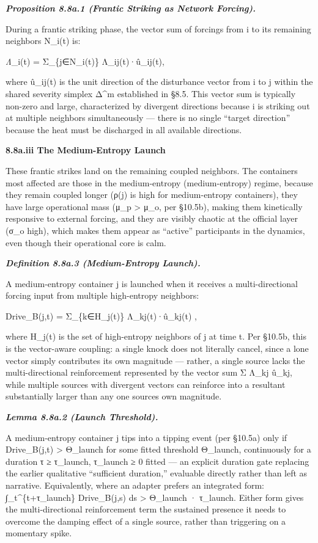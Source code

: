 \documentclass[
]{article}
\begin{document}
\emph{\textbf{Proposition 8.8a.1 (Frantic Striking as Network
Forcing).}}

During a frantic striking phase, the vector sum of forcings from i to
its remaining neighbors N\_i(t) is:

\emph{Λ⃗}\_i(t) = Σ\_\{j∈N\_i(t)\} Λ\_ij(t)·û\_ij(t),

where û\_ij(t) is the unit direction of the disturbance vector from i to
j within the shared severity simplex Δ\^{}m established in §8.5. This
vector sum is typically non-zero and large, characterized by divergent
directions because i is striking out at multiple neighbors
simultaneously --- there is no single ``target direction'' because the
heat must be discharged in all available directions.

\textbf{8.8a.iii The Medium-Entropy Launch}

These frantic strikes land on the remaining coupled neighbors. The
containers most affected are those in the medium-entropy
(medium-entropy) regime, because they remain coupled longer (ρ(j) is
high for medium-entropy containers), they have large operational mass
(μ\_p \textgreater{} μ\_o, per §10.5b), making them kinetically
responsive to external forcing, and they are visibly chaotic at the
official layer (σ\_o high), which makes them appear as ``active''
participants in the dynamics, even though their operational core is
calm.

\emph{\textbf{Definition 8.8a.3 (Medium-Entropy Launch).}}

A medium-entropy container j is launched when it receives a
multi-directional forcing input from multiple high-entropy neighbors:

Drive\_B(j,t) = \textbar{} Σ\_\{k∈H\_j(t)\} Λ\_kj(t)·û\_kj(t) \textbar,

where H\_j(t) is the set of high-entropy neighbors of j at time t. Per
§10.5b, this is the vector-aware coupling: a single knock does not
literally cancel, since a lone vector simply contributes its own
magnitude --- rather, a single source lacks the multi-directional
reinforcement represented by the vector sum \textbar Σ Λ\_kj
û\_kj\textbar, while multiple sources with divergent vectors can
reinforce into a resultant substantially larger than any one
source\textquotesingle s own magnitude.

\emph{\textbf{Lemma 8.8a.2 (Launch Threshold).}}

A medium-entropy container j tips into a tipping event (per §10.5a) only
if Drive\_B(j,t) \textgreater{} Θ\_launch for some fitted threshold
Θ\_launch, continuously for a duration τ ≥ τ\_launch, τ\_launch ≥ 0
fitted --- an explicit duration gate replacing the earlier qualitative
``sufficient duration,'' evaluable directly rather than left as
narrative. Equivalently, where an adapter prefers an integrated form:
∫\_t\^{}\{t+τ\_launch\} Drive\_B(j,s) ds \textgreater{} Θ\_launch ·
τ\_launch. Either form gives the multi-directional reinforcement term
the sustained presence it needs to overcome the damping effect of a
single source, rather than triggering on a momentary spike.
\end{document}
